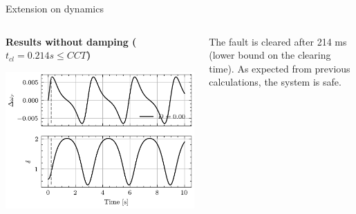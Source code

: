 \begin{frame} {Extension on dynamics}
\begin{columns}
    \begin{column}{0.55\textwidth}
        \textbf{Results without damping ($t_{cl} = 0.214 s \leq CCT$)}
        \begin{center}
        \includegraphics[width=0.9\linewidth]{images/P-dynamics.png}
        \end{center}
    \end{column}
    \begin{column}{0.45\textwidth}
        The fault is cleared after 214 ms (lower bound on the clearing time). As expected from previous calculations, the system is safe.
    \end{column}
\end{columns}
\end{frame}

